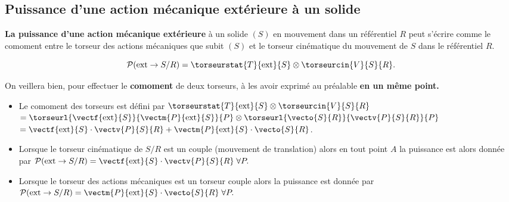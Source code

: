 \subsection{Puissance d'une action mécanique extérieure à un solide}
\begin{defi}
\textbf{La puissance d'une action mécanique extérieure} à un solide $(S)$ en mouvement dans un référentiel $R$ peut s'écrire comme le comoment entre le torseur des actions mécaniques que subit $(S)$ et le torseur cinématique du mouvement de $S$ dans le référentiel $R$.

$$
\mathcal{P}(\text{ext} \rightarrow S/R)=\torseurstat{T}{\text{ext}}{S}\otimes \torseurcin{V}{S}{R}.
$$
\end{defi}



\begin{warn}
On veillera bien, pour effectuer le \textbf{comoment} de deux torseurs, à les avoir exprimé au préalable {\textbf{en un même point.}}
\end{warn}

\begin{remarque}%
\begin{itemize}
\item Le comoment des torseurs est défini par 
$\torseurstat{T}{\text{ext}}{S}\otimes \torseurcin{V}{S}{R}$
$=
\torseurl{\vectf{\text{ext}}{S}}{\vectm{P}{\text{ext}}{S}}{P}
\otimes \torseurl{\vecto{S}{R}}{\vectv{P}{S}{R}}{P}$ 
$=\vectf{\text{ext}}{S}\cdot \vectv{P}{S}{R}+ \vectm{P}{\text{ext}}{S}\cdot\vecto{S}{R}$.

\item Lorsque le torseur cinématique de $S/R$ est un couple (mouvement de translation) alors en tout point $A$ la puissance est alors donnée par
$
\mathcal{P}(\text{ext} \rightarrow S/R)=\vectf{\text{ext}}{S}\cdot \vectv{P}{S}{R} \;
\forall P.
$

\item Lorsque le torseur des actions mécaniques est un torseur couple alors la puissance est donnée par
$
\mathcal{P}(\text{ext} \rightarrow S/R)=\vectm{P}{\text{ext}}{S}\cdot\vecto{S}{R}\;
\forall P.
$

\end{itemize}
\end{remarque}%




